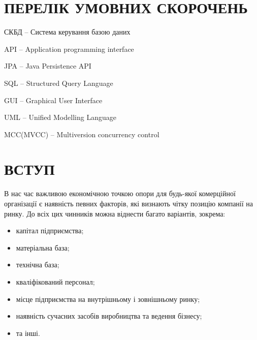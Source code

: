 







\setcounter{page}{6}
\tableofcontents

%

\section*{ПЕРЕЛІК УМОВНИХ СКОРОЧЕНЬ}
\par СКБД -- Система керування базою даних
\par API -- Application programming interface
\par JPA -- Java Persistence API
\par SQL -- Structured Query Language
\par GUI -- Graphical User Interface
\par UML -- Unified Modelling Language
\par MCC(MVCC) -- Multiversion concurrency control


\section*{ВСТУП}
В нас час важливою економічною точкою опори для будь-якої комерційної організації є наявність певних факторів, які визнають чітку позицію компанії на ринку. До всіх цих чинників можна віднести багато варіантів, зокрема:
\begin{itemize}
\item капітал підприємства;
\item матеріальна база;
\item технічна база;
\item кваліфікований персонал;
\item місце підприємства на внутрішньому і зовнішньому ринку;
\item наявність сучасних засобів виробництва та ведення бізнесу;
\item та інші.
\end{itemize}


